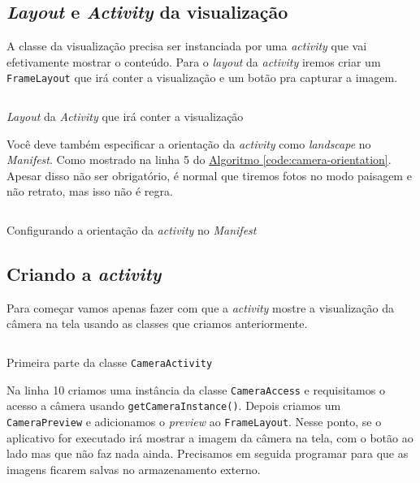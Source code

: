 \documentclass[a4paper,12pt,brazil,oneside]{book}
\begin{document}
	\subsection{\emph{Layout} e \emph{Activity} da visualização}

	A classe da visualização precisa ser instanciada por uma \emph{activity} que vai efetivamente mostrar o conteúdo. Para o \emph{layout} da \emph{activity} iremos criar um \texttt{FrameLayout} que irá conter a visualização e um botão pra capturar a imagem.

		\begin{listing}[H]
		\inputminted[linenos=true,fontsize=\small,frame=lines, framesep=2mm, tabsize=2,numbersep=5pt]{xml}{src/api/camera/camera-layout.xml}
		\caption{\emph{Layout} da \emph{Activity} que irá conter a visualização}
		\label{code:camera-layout}
		\end{listing} 	

	Você deve também especificar a orientação da \emph{activity} como \emph{landscape} no \emph{Manifest}. Como mostrado na linha 5 do \hyperref[code:camera-orientation]{Algoritmo \ref*{code:camera-orientation}}. Apesar disso não ser obrigatório, é normal que tiremos fotos no modo paisagem e não retrato, mas isso não é regra.

		\begin{listing}[H]
		\inputminted[linenos=true,fontsize=\small,frame=lines, framesep=2mm, tabsize=2,numbersep=5pt]{xml}{src/api/camera/camera-orientation.xml}
		\caption{Configurando a orientação da \emph{activity} no \emph{Manifest}}
		\label{code:camera-orientation}
		\end{listing} 	

	\subsection{Criando a \emph{activity}}

		Para começar vamos apenas fazer com que a \emph{activity} mostre a visualização da câmera na tela usando as classes que criamos anteriormente. 

		\begin{listing}[H]
		\inputminted[linenos=true,fontsize=\small,frame=lines, framesep=2mm, tabsize=2,numbersep=5pt]{java}{src/api/camera/camera-activity.java}
		\caption{Primeira parte da classe \texttt{CameraActivity}}
		\label{code:camera-activity}
		\end{listing} 			

		Na linha 10 criamos uma instância da classe \texttt{CameraAccess} e requisitamos o acesso a câmera usando \texttt{getCameraInstance()}. Depois criamos um \texttt{CameraPreview} e adicionamos o \emph{preview} ao \texttt{FrameLayout}. Nesse ponto, se o aplicativo for executado irá mostrar a imagem da câmera na tela, com o botão ao lado mas que não faz nada ainda. Precisamos em seguida programar para que as imagens ficarem salvas no armazenamento externo.
\end{document}
